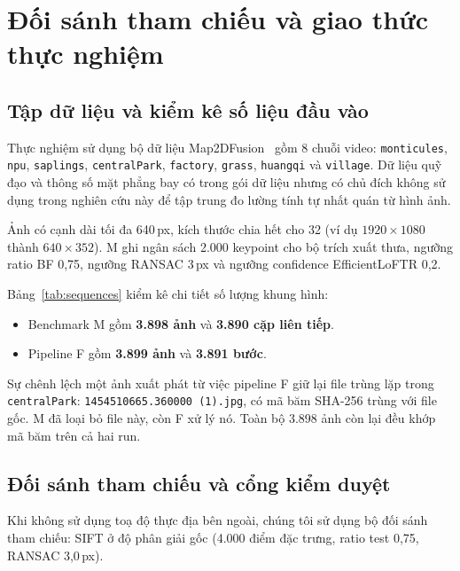 \documentclass[conference]{IEEEtran}
\begin{document}
\section{Đối sánh tham chiếu và giao thức thực nghiệm}
\label{sec:protocol}

\subsection{Tập dữ liệu và kiểm kê số liệu đầu vào}
\label{subsec:datasets}

Thực nghiệm sử dụng bộ dữ liệu Map2DFusion~\cite{map2dfusion} gồm 8 chuỗi video: \texttt{monticules}, \texttt{npu}, \texttt{saplings}, \texttt{centralPark}, \texttt{factory}, \texttt{grass}, \texttt{huangqi} và \texttt{village}. Dữ liệu quỹ đạo và thông số mặt phẳng bay có trong gói dữ liệu nhưng có chủ đích không sử dụng trong nghiên cứu này để tập trung đo lường tính tự nhất quán từ hình ảnh.

\begin{table}[h]
\centering
\caption{Kiểm kê tập dữ liệu và thông số các chuỗi thực nghiệm}
\label{tab:sequences}
\footnotesize

\end{table}

Ảnh có cạnh dài tối đa 640\,px, kích thước chia hết cho 32 (ví dụ $1920\times1080$ thành $640\times352$). M ghi ngân sách 2.000 keypoint cho bộ trích xuất thưa, ngưỡng ratio BF 0,75, ngưỡng RANSAC 3\,px và ngưỡng confidence EfficientLoFTR 0,2.

Bảng~\ref{tab:sequences} kiểm kê chi tiết số lượng khung hình:
\begin{itemize}
    \item Benchmark M gồm \textbf{3.898 ảnh} và \textbf{3.890 cặp liên tiếp}.
    \item Pipeline F gồm \textbf{3.899 ảnh} và \textbf{3.891 bước}.
\end{itemize}
Sự chênh lệch một ảnh xuất phát từ việc pipeline F giữ lại file trùng lặp trong \texttt{centralPark}: \nolinkurl{1454510665.360000 (1).jpg}, có mã băm SHA-256 trùng với file gốc. M đã loại bỏ file này, còn F xử lý nó. Toàn bộ 3.898 ảnh còn lại đều khớp mã băm trên cả hai run.

\subsection{Đối sánh tham chiếu và cổng kiểm duyệt}
\label{subsec:ref_gating}

Khi không sử dụng toạ độ thực địa bên ngoài, chúng tôi sử dụng bộ đối sánh tham chiếu: SIFT ở độ phân giải gốc (4.000 điểm đặc trưng, ratio test 0,75, RANSAC 3,0\,px).
\end{document}
